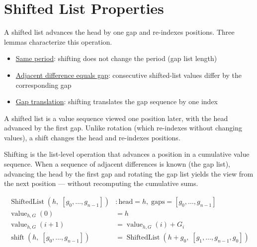 \section{Shifted List Properties}
\label{sec:shifted-list}

A shifted list advances the head by one gap and re-indexes positions.
Three lemmas characterize this operation.

\begin{itemize}
  \item \href{https://github.com/thiagomata/prime-numbers/blob/list-article-v1.0.0/src/main/scala/v1/chapter3/list/ShiftedList.scala}{Same period}:
    shifting does not change the period (gap list length)
  \item \href{https://github.com/thiagomata/prime-numbers/blob/list-article-v1.0.0/src/main/scala/v1/chapter3/list/ShiftedList.scala}{Adjacent difference equals gap}:
    consecutive shifted-list values differ by the corresponding gap
  \item \href{https://github.com/thiagomata/prime-numbers/blob/list-article-v1.0.0/src/main/scala/v1/chapter3/list/ShiftedList.scala}{Gap translation}:
    shifting translates the gap sequence by one index
\end{itemize}

A shifted list is a value sequence viewed one position later, with the
head advanced by the first gap. Unlike rotation (which re-indexes without
changing values), a shift changes the head and re-indexes positions.

Shifting is the list-level operation that advances a position in a
cumulative value sequence. When a sequence of adjacent differences is
known (the gap list), advancing the head by the first gap and rotating
the gap list yields the view from the next position --- without
recomputing the cumulative sums.

\begin{equation*}
\begin{aligned}
\operatorname{ShiftedList}(h,\; [g_0,\dots,g_{n-1}]) &: \text{head} = h,\; \text{gaps} = [g_0,\dots,g_{n-1}] \\
\operatorname{value}_{h,G}(0) &= h \\
\operatorname{value}_{h,G}(i + 1) &= \operatorname{value}_{h,G}(i) + G_i \\
\operatorname{shift}(h,\; [g_0,\dots,g_{n-1}]) &= \operatorname{ShiftedList}(h + g_0,\; [g_1,\dots,g_{n-1}, g_0])
\end{aligned}
\end{equation*}

